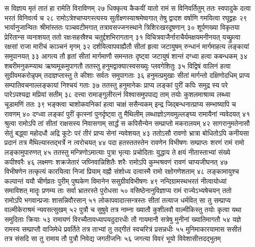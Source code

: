 स विज्ञाय मृतं तातं हा रामेति विराविणम् २७
धिक्कृत्य कैकयीं यातो रामं स विनिवर्तितुम्
ततः स्वपादुके दत्वा भरतं विनिवर्त्य च २८
रामोऽत्रेश्चाप्यगस्त्यस्य सुतीक्ष्णस्याश्रमेष्वगात्
तेषु द्वादश वर्षाणि गमयित्वा रघूद्वहः २९
भार्यानुजान्वितः श्रीमांस्ततः पञ्चवटीमगात्
तत्रावसज्जनस्थाने त्रिशिरःखरदूषणान् ३०
शूर्पणख्या विकृतया प्रेरितान्स व्यनाशयत्
ततो रक्षःसहस्रैश्च चतुर्द्दशभिरागतान् ३१
विचित्रवाजैर्नाराचैर्यमक्षयमनीनयत्
यच्छ्रुत्वा रक्षसां राजा मारीचं काञ्चनं मृगम् ३२
दर्शयित्वापवाह्यैतौ सीतां हृत्वा जटायुषम्
रुन्धानं मार्गमाहत्य लङ्कायां समुपानयत् ३३
आगत्य तौ हृतां सीतां मार्गमाणौ समन्ततः
दृष्ट्वा जटायुषं शान्तं दग्ध्वा हत्वा कबन्धकम् ३४
शबरीमनुकम्प्याथ ऋष्यमूकमुपागतौ
ततस्तु हनुमद्वाक्यात्स्वसख्युः प्लवगेशितुः ३५
विद्विषं वालिनं हत्वा सुग्रीवमकरोन्नृपम्
तदाज्ञप्तास्तु ते कीशाः सर्वतः समुपागताः ३६
हनुमत्प्रमुखाः सीतां मार्गन्तो दक्षिणोदधिम्
प्राप्य सम्पातिवचनाल्लङ्कायां निश्चयं गताः ३७
ततस्तु हनुमानेकः प्राप्य लङ्कां पुरीं कपिः
समुद्र स्य परे पारेऽपश्यद्रा मप्रियां सतीम् ३८
दत्त्वा रामाङ्गुलीरत्नं विश्वासमुपपाद्य ताम्
तयोः कुशलमाश्राव्य लब्ध्वा चूडामणिं ततः ३९
भङ्क्त्वा चाशोकवनिकां हत्वा चाक्षं ससैन्यकम्
इन्द्र जिद्बन्धनात्प्राप्य सम्भाष्यापि च रावणम् ४०
दग्ध्वा लङ्कां पुरीं कृत्स्नां पुनर्दृष्ट्वा तु मैथिलीम्
लब्धाज्ञोऽणवमुल्लङ्घ्य रामायैनां न्यवेदयत् ४१
श्रुत्वा रामोऽपि तां सीतां राक्षसस्य निवासगाम्
सार्द्धं स कपिसैन्येन सम्प्राप्तो मकरालयम् ४२
सागरानुमतेनासौ सेतुं बद्ध्वा महोदधौ
अद्रि कूटेः परं तीरं प्राप्य सेनां न्यवेशयत् ४३
ततोऽसौ रावणो भ्रात्रा बोधितोऽपि कनीयसा
प्रदानं तत्र मैथिल्यास्तद्भर्त्रे न त्वरोचयत् ४४
पदा हतस्ततस्तेन रावणेन विभीषणः
सम्प्राप्तः शरणं रामं रामो लङ्कामुपारुणत् ४५
ततस्तु मन्त्रिणोऽमात्याः पुत्रा भृत्याः प्रचोदिताः
युद्धाय ते क्षयं नीतास्ताभ्यां संख्ये कपीश्वरैः ४६
लक्ष्मणः शक्रजेतारं जघ्निवान्निशितैः शरैः
रामोऽपि कुम्भश्रवणं रावणं चाप्यजीघनत् ४७
विभीषणेन तत्कृत्यं कारयित्वा निजां प्रियाम्
वह्नौ संशोध्य दत्वास्मै रामो रक्षोगणेशताम् ४८
लङ्कामायुश्च कल्पान्तं ययौ चीर्णव्रतः पुरीम्
पुष्पकेण विमानेन ससुग्रीवविभीषणः ४९
नन्दिग्रामस्थभरतं नीत्वायोध्यां समाविशत्
मातॄः प्रणम्य ताः सर्वा भ्रातरस्ते पुरोधसा ५०
वसिष्ठेनानुविज्ञाप्य रामं राज्येऽभ्यषेचयन्
ततो रामोऽपि भगवान्प्रजाः शासन्निवौरसान् ५१
लोकापवादात्सन्त्रस्तः सीतां तत्याज धर्मवित्
सा तु सम्प्राप्य वाल्मीकेराश्रमं न्यवसत्सुखम् ५२
पुत्रौ च सुषुवे तत्र नाम्ना ख्यातौ कुशीलवौ
वाल्मीकिस्तु तयोः कृत्वा यथा समुदिताः क्रियाः ५३
रामायणं विरच्यैतावध्यापयदुदारधीः
तौ गायमानौ सत्रेषु मुनीनां ख्यातिमागतौ ५४
यज्ञे रामस्य सम्प्राप्तौ वाजिमेधे प्रवर्तिते
तत्र ताभ्यां तु तद्गीतं स्वचरित्रं प्रसन्नधीः ५५
मुनिमाकारयामास ससीतं तत्र संसदि
सा तु रामाय तौ पुत्रौ निवेद्य जगतीजनिः ५६
जगत्या विवरं भूयो विवेशासीत्तदद्भुतम्
